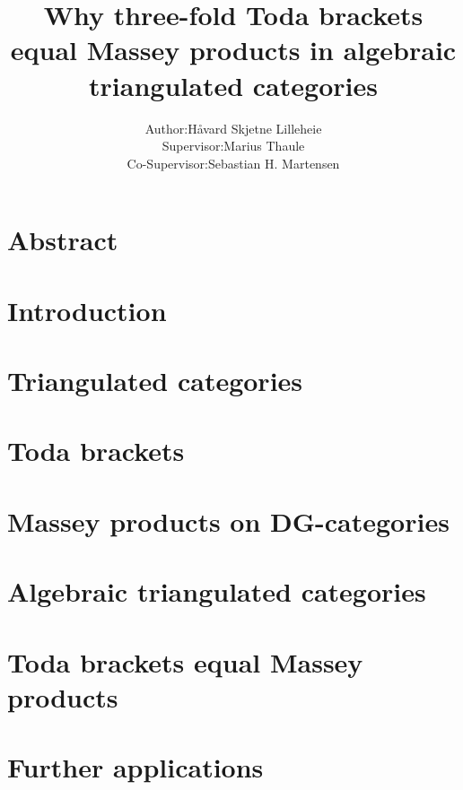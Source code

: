 \documentclass[a4paper, 10pt]{article}
\title{Why three-fold Toda brackets equal Massey products in algebraic triangulated categories}
\author{
    \begin{tabular}{rl}
        Author:& Håvard Skjetne Lilleheie\\
        Supervisor:& Marius Thaule\\
        Co-Supervisor:& Sebastian H. Martensen
    \end{tabular}
}
\begin{document}
\maketitle

\tableofcontents

\section*{Abstract}


\section{Introduction}


\section{Triangulated categories}
\label{section:tri_cats}


\section{Toda brackets}
\label{section:toda_brackets}


\section{Massey products on DG-categories}
\label{section:massey_prods_on_dg_cats}


\section{Algebraic triangulated categories}
\label{section:alg_tri_cats}


\section{Toda brackets equal Massey products}
\label{section:toda_eq_massey}


\section{Further applications}
\label{section:applications}


% 

{}

\end{document}

